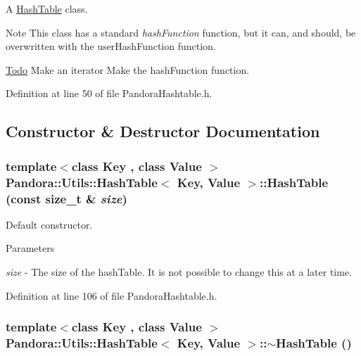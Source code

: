 A \hyperlink{classPandora_1_1Utils_1_1HashTable}{HashTable} class. \begin{DoxyNote}{Note}
This class has a standard {\itshape hashFunction\/} function, but it can, and should, be overwritten with the userHashFunction function. 
\end{DoxyNote}
\begin{Desc}
\item[\hyperlink{todo__todo000001}{Todo}]Make an iterator Make the hashFunction function. \end{Desc}


Definition at line 50 of file PandoraHashtable.h.

\subsection{Constructor \& Destructor Documentation}
\hypertarget{classPandora_1_1Utils_1_1HashTable_a3650951a9de3e61dd2deade67636a0cf}{
\subsubsection[{HashTable}]{\setlength{\rightskip}{0pt plus 5cm}template$<$class Key , class Value $>$ {\bf Pandora::Utils::HashTable}$<$ Key, Value $>$::{\bf HashTable} (const size\_\-t \& {\em size})}}
\label{classPandora_1_1Utils_1_1HashTable_a3650951a9de3e61dd2deade67636a0cf}


Default constructor. 
\begin{DoxyParams}{Parameters}
\item[{\em size}]-\/ The size of the hashTable. It is not possible to change this at a later time. \end{DoxyParams}


Definition at line 106 of file PandoraHashtable.h.\hypertarget{classPandora_1_1Utils_1_1HashTable_adfb815eb2cfe21eca1beffa61be7726d}{
\subsubsection[{$\sim$HashTable}]{\setlength{\rightskip}{0pt plus 5cm}template$<$class Key , class Value $>$ {\bf Pandora::Utils::HashTable}$<$ Key, Value $>$::$\sim${\bf HashTable} ()}}
\label{classPandora_1_1Utils_1_1HashTable_adfb815eb2cfe21eca1beffa61be7726d}


